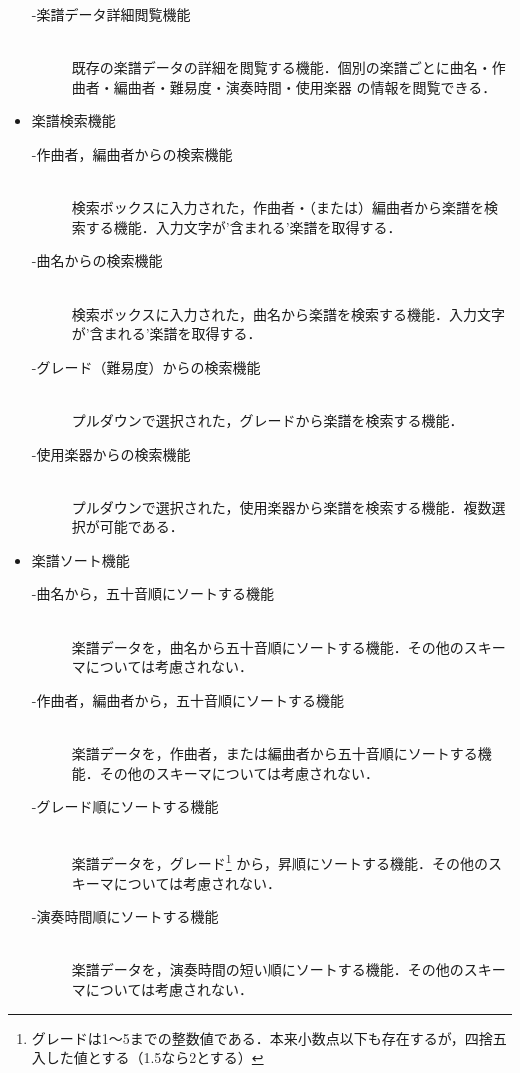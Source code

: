 \begin{itemize}
\begin{description}
        \item[-楽譜データ詳細閲覧機能] \mbox{}\\
            既存の楽譜データの詳細を閲覧する機能．個別の楽譜ごとに曲名・作曲者・編曲者・難易度・演奏時間・使用楽器
            の情報を閲覧できる．
    \end{description}
    \item 楽譜検索機能
    \begin{description}
        \item[-作曲者，編曲者からの検索機能]\mbox{}\\
            検索ボックスに入力された，作曲者・（または）編曲者から楽譜を検索する機能．入力文字が'含まれる'楽譜を取得する．
        \item[-曲名からの検索機能] \mbox{}\\
            検索ボックスに入力された，曲名から楽譜を検索する機能．入力文字が'含まれる'楽譜を取得する．
        \item[-グレード（難易度）からの検索機能] \mbox{}\\
            プルダウンで選択された，グレードから楽譜を検索する機能．
        \item[-使用楽器からの検索機能] \mbox{}\\
            プルダウンで選択された，使用楽器から楽譜を検索する機能．複数選択が可能である．
    \end{description}
    \item 楽譜ソート機能
    \begin{description}
        \item[-曲名から，五十音順にソートする機能]\mbox{}\\
            楽譜データを，曲名から五十音順にソートする機能．その他のスキーマについては考慮されない．
        \item[-作曲者，編曲者から，五十音順にソートする機能] \mbox{}\\
            楽譜データを，作曲者，または編曲者から五十音順にソートする機能．その他のスキーマについては考慮されない．
        \item[-グレード順にソートする機能] \mbox{}\\
            楽譜データを，グレード\footnote{グレードは1〜5までの整数値である．本来小数点以下も存在するが，四捨五入した値とする（1.5なら2とする）}
            から，昇順にソートする機能．その他のスキーマについては考慮されない．
        \item[-演奏時間順にソートする機能] \mbox{}\\
            楽譜データを，演奏時間の短い順にソートする機能．その他のスキーマについては考慮されない．

\end{description}
\end{itemize}
